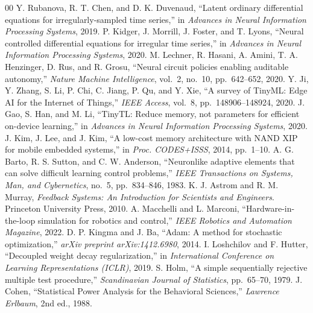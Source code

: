 \documentclass[conference]{IEEEtran}
\begin{document}
\begin{thebibliography}{00}
 Y. Rubanova, R. T. Chen, and D. K. Duvenaud, ``Latent ordinary differential equations for irregularly-sampled time series,'' in \textit{Advances in Neural Information Processing Systems}, 2019.
 P. Kidger, J. Morrill, J. Foster, and T. Lyons, ``Neural controlled differential equations for irregular time series,'' in \textit{Advances in Neural Information Processing Systems}, 2020.
 M. Lechner, R. Hasani, A. Amini, T. A. Henzinger, D. Rus, and R. Grosu, ``Neural circuit policies enabling auditable autonomy,'' \textit{Nature Machine Intelligence}, vol.~2, no.~10, pp.~642--652, 2020.
 Y. Ji, Y. Zhang, S. Li, P. Chi, C. Jiang, P. Qu, and Y. Xie, ``A survey of TinyML: Edge AI for the Internet of Things,'' \textit{IEEE Access}, vol.~8, pp.~148906--148924, 2020.
 J. Gao, S. Han, and M. Li, ``TinyTL: Reduce memory, not parameters for efficient on-device learning,'' in \textit{Advances in Neural Information Processing Systems}, 2020.
 J. Kim, J. Lee, and J. Kim, ``A low-cost memory architecture with NAND XIP for mobile embedded systems,'' in \textit{Proc. CODES+ISSS}, 2014, pp.~1--10.
 A. G. Barto, R. S. Sutton, and C. W. Anderson, ``Neuronlike adaptive elements that can solve difficult learning control problems,'' \textit{IEEE Transactions on Systems, Man, and Cybernetics}, no.~5, pp.~834--846, 1983.
 K. J. Astrom and R. M. Murray, \textit{Feedback Systems: An Introduction for Scientists and Engineers}. Princeton University Press, 2010.
 A. Macchelli and L. Marconi, ``Hardware-in-the-loop simulation for robotics and control,'' \textit{IEEE Robotics and Automation Magazine}, 2022.
 D. P. Kingma and J. Ba, ``Adam: A method for stochastic optimization,'' \textit{arXiv preprint arXiv:1412.6980}, 2014.
 I. Loshchilov and F. Hutter, ``Decoupled weight decay regularization,'' in \textit{International Conference on Learning Representations (ICLR)}, 2019.
 S. Holm, ``A simple sequentially rejective multiple test procedure,'' \textit{Scandinavian Journal of Statistics}, pp.~65--70, 1979.
 J. Cohen, ``Statistical Power Analysis for the Behavioral Sciences,'' \textit{Lawrence Erlbaum}, 2nd ed., 1988.
\end{thebibliography}
\end{document}
